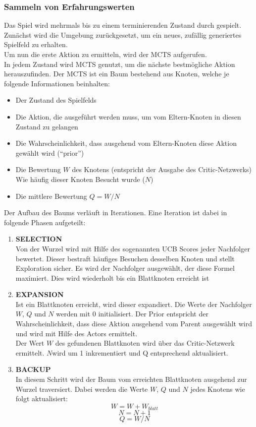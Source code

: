 \subsubsection*{Sammeln von Erfahrungswerten}
Das Spiel wird mehrmals bis zu einem terminierenden Zustand durch gespielt.
\\
Zunächst wird die Umgebung zurückgesetzt, um ein neues, zufällig generiertes Spielfeld zu erhalten.
\\
Um nun die erste Aktion zu ermitteln, wird der MCTS aufgerufen. 
\\
In jedem Zustand wird MCTS genutzt, um die nächste bestmögliche Aktion herauszufinden. Der MCTS ist ein Baum bestehend aus Knoten, welche je folgende Informationen beinhalten:
\begin{itemize}
	\item Der Zustand des Spielfelds
	\item Die Aktion, die ausgeführt werden muss, um vom Eltern-Knoten in diesen Zustand zu gelangen
	\item Die Wahrscheinlichkeit, dass ausgehend vom Eltern-Knoten diese Aktion gewählt wird (“prior”)
	\item Die Bewertung $W$ des Knotens (entspricht der Ausgabe des Critic-Netzwerks)
	Wie häufig dieser Knoten Besucht wurde ($N$)
	
	\item Die mittlere Bewertung $Q = W / N$
\end{itemize}
Der Aufbau des Baums verläuft in Iterationen. Eine Iteration ist dabei in folgende Phasen aufgeteilt:
\begin{enumerate}
	\item \textbf{SELECTION}\\ 
	Von der Wurzel wird mit Hilfe des sogenannten UCB Scores jeder Nachfolger bewertet. Dieser bestraft häufiges Besuchen desselben Knoten und stellt Exploration sicher. Es wird der Nachfolger ausgewählt, der diese Formel maximiert. Dies wird wiederholt bis ein Blattknoten erreicht ist
	\item \textbf{EXPANSION}\\
	Ist ein Blattknoten erreicht, wird dieser expandiert. Die Werte der Nachfolger $W$, $Q$ und $N$ werden mit $0$ initialisiert. Der Prior entspricht der Wahrscheinlichkeit, dass diese Aktion ausgehend vom Parent ausgewählt wird und wird mit Hilfe des Actors ermittelt.\\
	Der Wert $W$ des gefundenen Blattknoten wird über das Critic-Netzwerk ermittelt. $N $wird um 1 inkrementiert und Q entsprechend aktualisiert.
	\item \textbf{BACKUP}\\
	In diesem Schritt wird der Baum vom erreichten Blattknoten ausgehend zur Wurzel traversiert. Dabei werden die Werte $W$, $Q$ und $N$ jedes Knotens wie folgt aktualisiert:
	\begin{equation}W = W + W_{blatt}\end{equation}
	\begin{equation}N = N + 1\end{equation}
	\begin{equation}Q = W / N\end{equation}
\end{enumerate}
